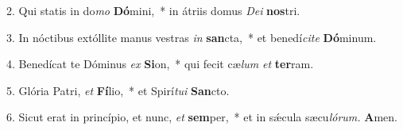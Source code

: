 \item 2. Qui statis in do\textit{mo} \textbf{Dó}mini,~* in átriis domus \textit{Dei} \textbf{nos}tri.
\item 3. In nóctibus extóllite manus vestras \textit{in} \textbf{san}cta,~* et benedí\textit{cite} \textbf{Dó}minum.
\item 4. Benedícat te Dóminus \textit{ex} \textbf{Si}on,~* qui fecit cæ\textit{lum} \textit{et} \textbf{ter}ram.
\item 5. Glória Patri, \textit{et} \textbf{Fí}lio,~* et Spirí\hspace{0.03em}\textit{tui} \textbf{San}cto.
\item 6. Sicut erat in princípio, et nunc, \textit{et} \textbf{sem}per,~* et in sǽcula sæcu\hspace{0.03em}\textit{lórum.} \textbf{A}men.